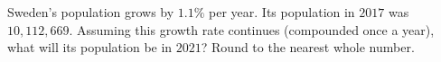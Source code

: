 Sweden's population grows by $1.1\%$ per year. Its population in $2017$ was $10{,}112{,}669$. Assuming this growth rate continues (compounded once a year), what will its population be in $2021$? Round to the nearest whole number.
